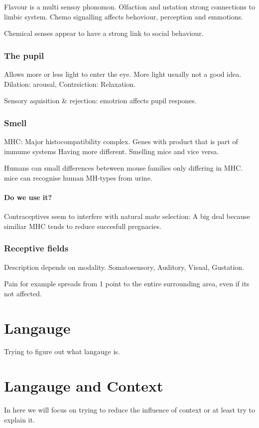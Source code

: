 \documentclass{article}
\begin{document}
Flavour is a multi sensoy phonomon. Olfaction and ustation strong connections
to limbic system. Chemo signalling affects behoviour, perception and emmotions.

Chemical senses appear to have a strong link to social behaviour.

\subsubsection{The pupil}
Allows more or less light to enter the eye. More light usually not a good idea.
Dilation: arousal, Contrsiction: Relaxation.

Sensory aquisition \& rejection: emotrion affects pupil respones.

\subsubsection{Smell}

MHC: Major histocompatibility complex. Genes with product that is part of
immume systems Having more different. Smelling mice and vice versa.

Humans can small differences beteween mouse families only differing in MHC.
mice can recognise human MH-types from urine.


\paragraph{Do we use it?} Contraceptives seem to interfere with natural mate
selection: A big deal because similiar MHC tends to reduce succesfull
pregnacies.

\subsubsection{Receptive fields}
Description depends on modality. Somatosensory, Auditory, Visual, Gustation.

Pain for example spreads from 1 point to the entire surrounding area, even
if its not affected.

\section{Langauge}
Trying to figure out what langauge is.

\section{Langauge and Context}
In here we will focus on trying to reduce the influence of context or
at least try to explain it.
\end{document}
